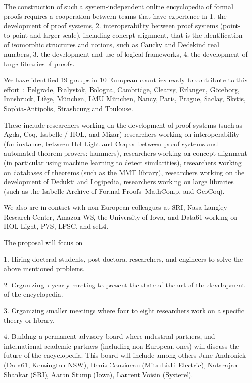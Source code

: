 The construction of such a system-independent online encyclopedia of formal proofs requires a cooperation between teams that have experience in
1. the development of proof systems,
2. interoperability between proof systems (point-to-point and larger scale), including concept alignment, that is the identification of isomorphic structures and notions, such as Cauchy and Dedekind real numbers,
3. the development and use of logical frameworks,
4. the development of large libraries of proofs.

We have identified 19 groups in 10 European countries ready to contribute to this effort : Belgrade, Bialystok, Bologna, Cambridge, Clearsy, Erlangen, G\"oteborg, Innsbruck, Liège, München, LMU München, Nancy, Paris, Prague, Saclay, Sketis, Sophia-Antipolis, Strasbourg and Toulouse.

These include researchers working on the development of proof systems
(such as Agda, Coq, Isabelle / HOL, and Mizar) researchers working on
interoperability (for instance, between Hol Light and Coq or between
proof systems and automated theorem provers: hammers), researchers
working on concept alignment (in particular using machine learning to
detect similarities), researchers working on databases of theorems
(such as the MMT library), researchers working on the development of
Dedukti and Logipedia, researchers working on large libraries (such as
the Isabelle Archive of Formal Proofs, MathComp, and GeoCoq).


We also are in contact with non-European colleagues at SRI, Nasa
Langley Research Center, Amazon WS, the University of Iowa, and Data61
working on HOL Light, PVS, LFSC, and seL4.

The proposal will focus on

1. Hiring doctoral students, post-doctoral researchers, and engineers to solve the above mentioned problems.

2. Organizing a yearly meeting to present the state of the art of the development of the encyclopedia.

3. Organizing smaller meetings where four to eight researchers work on a specific theory or library.

4. Building a permanent advisory board where industrial partners, and
international academic partners (including non-European ones) will
discuss the future of the encyclopedia. This board will include among
others June Andronick (Data61, Kensington NSW), Denis Cousineau
(Mitsubishi Electric), Natarajan Shankar (SRI), Aaron Stump (Iowa),
Laurent Voisin (Systerel).

